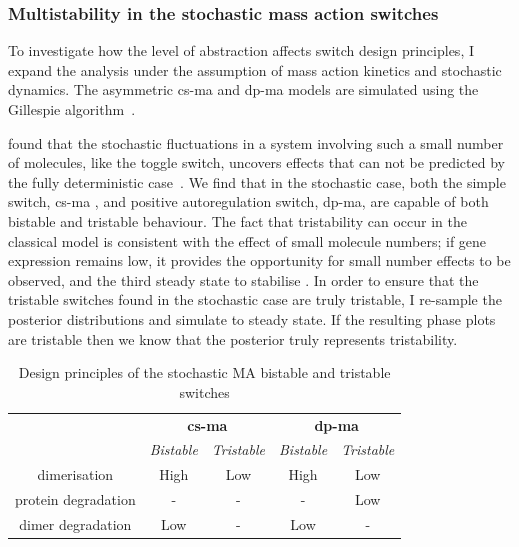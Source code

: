 \subsubsection{Multistability in the stochastic mass action switches}

To investigate how the level of abstraction affects switch design principles, I expand the analysis under the assumption of mass action kinetics and stochastic dynamics. The asymmetric \acrshort{cs-ma} and \acrshort{dp-ma} models are simulated using the Gillespie algorithm~\autocite{Gillespie:1977ww}.

\textcite{Ma:2012dt} found that the stochastic fluctuations in a system involving such a small number of molecules, like the toggle switch, uncovers effects that can not be predicted by the fully deterministic case~\autocite{Ma:2012dt}. We find that in the stochastic case, both the simple switch, \acrshort{cs-ma} , and positive autoregulation switch, \acrshort{dp-ma}, are capable of both bistable and tristable behaviour. The fact that tristability can occur in the classical model is consistent with the effect of small molecule numbers; if gene expression remains low, it provides the opportunity for small number effects to be observed, and the third steady state to stabilise \autocite{Ma:2012dt}. In order to ensure that the tristable switches found in the stochastic case are truly tristable, I re-sample the posterior distributions and simulate to steady state. If the resulting phase plots are tristable then we know that the posterior truly represents tristability. 


\begin{table}[tb]
\centering
\caption{Design principles of the stochastic MA bistable and tristable switches}
\label{tab:des_prin}
\begin{tabular}{@{}ccccc@{}}
\toprule
                    & \multicolumn{2}{c}{\textbf{\acrshort{cs-ma}}} & \multicolumn{2}{c}{\textbf{\acrshort{dp-ma}}} \\ \cmidrule(l){2-3}\cmidrule(l){4-5}
                    & \textit{Bistable}    & \textit{Tristable}   & \textit{Bistable}    & \textit{Tristable}   \\\cmidrule(l){2-2}\cmidrule(l){3-3}\cmidrule(l){4-4}\cmidrule(l){5-5}
dimerisation        & High        & Low         & High        & Low         \\
protein degradation & -           & -           & -           & Low         \\
dimer degradation   & Low         & -           & Low         & -           \\\bottomrule
\end{tabular}
\end{table}

